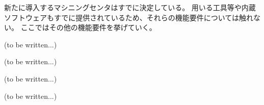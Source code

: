 

新たに導入するマシニングセンタはすでに決定している。
用いる工具等や内蔵ソフトウェアもすでに提供されているため、それらの機能要件については触れない。
ここではその他の機能要件を挙げていく。



(to be written...)



(to be written...)



(to be written...)



(to be written...)




